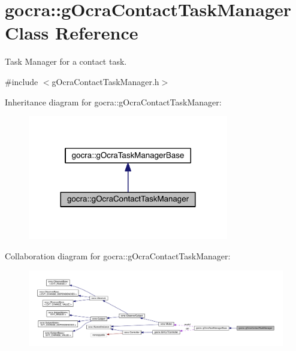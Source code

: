 \hypertarget{classgocra_1_1gOcraContactTaskManager}{}\section{gocra\+:\+:g\+Ocra\+Contact\+Task\+Manager Class Reference}
\label{classgocra_1_1gOcraContactTaskManager}


Task Manager for a contact task.  




{\ttfamily \#include $<$g\+Ocra\+Contact\+Task\+Manager.\+h$>$}



Inheritance diagram for gocra\+:\+:g\+Ocra\+Contact\+Task\+Manager\+:\nopagebreak
\begin{figure}[H]
\begin{center}
\leavevmode
\includegraphics[width=248pt]{d3/d01/classgocra_1_1gOcraContactTaskManager__inherit__graph}
\end{center}
\end{figure}


Collaboration diagram for gocra\+:\+:g\+Ocra\+Contact\+Task\+Manager\+:\nopagebreak
\begin{figure}[H]
\begin{center}
\leavevmode
\includegraphics[width=350pt]{dd/d38/classgocra_1_1gOcraContactTaskManager__coll__graph}
\end{center}
\end{figure}
